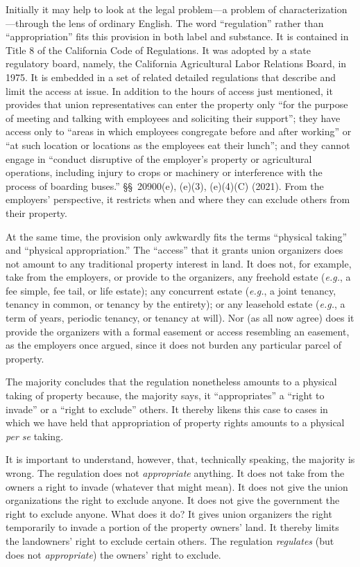 
Initially it may help to look at the legal problem---a problem of
characterization---through the lens of ordinary English. The word ``regulation''
rather than ``appropriation'' fits this provision in both label and substance.
It is contained in Title 8 of the California Code of Regulations. It was adopted
by a state regulatory board, namely, the California Agricultural Labor Relations
Board, in 1975. It is embedded in a set of related detailed regulations that
describe and limit the access at issue. In addition to the hours of access just
mentioned, it provides that union representatives can enter the property only
``for the purpose of meeting and talking with employees and soliciting their
support''; they have access only to ``areas in which employees congregate before
and after working'' or ``at such location or locations as the employees eat
their lunch''; and they cannot engage in ``conduct disruptive of the employer's
property or agricultural operations, including injury to crops or machinery or
interference with the process of boarding buses.'' \S\S~20900(e), (e)(3),
(e)(4)(C) (2021). From the employers' perspective, it restricts when and where
they can exclude others from their property.


At the same time, the provision only awkwardly fits the terms ``physical
taking'' and ``physical appropriation.'' The ``access'' that it grants union
organizers does not amount to any traditional property interest in land. It does
not, for example, take from the employers, or provide to the organizers, any
freehold estate (\textit{e.g.}, a fee simple, fee tail, or life estate); any
concurrent estate (\textit{e.g.}, a joint tenancy, tenancy in common, or tenancy
by the entirety); or any leasehold estate (\textit{e.g.}, a term of years,
periodic tenancy, or tenancy at will). Nor (as all now agree) does it provide
the organizers with a formal easement or access resembling an easement, as the
employers once argued, since it does not burden any particular parcel of
property. 


The majority concludes that the regulation nonetheless amounts to a physical
taking of property because, the majority says, it ``appropriates'' a ``right to
invade'' or a ``right to exclude'' others. It thereby likens this case to cases
in which we have held that appropriation of property rights amounts to a
physical \textit{per se} taking. 


It is important to understand, however, that, technically speaking, the majority
is wrong. The regulation does not \textit{appropriate} anything. It does not
take from the owners a right to invade (whatever that might mean). It does not
give the union organizations the right to exclude anyone. It does not give the
government the right to exclude anyone. What does it do? It gives union
organizers the right temporarily to invade a portion of the property owners'
land. It thereby limits the landowners' right to exclude certain others. The
regulation \textit{regulates} (but does not \textit{appropriate}) the owners'
right to exclude.


